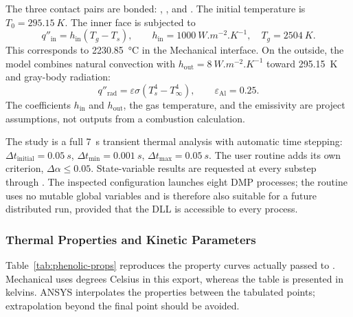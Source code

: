 \documentclass[oneside,openany]{amsdtx}
\begin{document}
The three contact pairs are bonded: ,
, and . The initial
temperature is \(T_0=\SI{295.15}{K}\). The inner face is subjected to
\begin{equation}
  q''_\mathrm{in}=h_\mathrm{in}(T_g-T_s),\qquad
  h_\mathrm{in}=\SI{1000}{W.m^{-2}.K^{-1}},\quad T_g=\SI{2504}{K}.
  \label{eq:inner-bc}
\end{equation}
This corresponds to \SI{2230.85}{\degreeCelsius} in the Mechanical interface.
On the outside, the model combines natural convection with
\(h_\mathrm{out}=\SI{8}{W.m^{-2}.K^{-1}}\) toward \SI{295.15}{K} and
gray-body radiation:
\begin{equation}
  q''_\mathrm{rad}=\varepsilon\sigma(T_s^4-T_\infty^4),\qquad
  \varepsilon_\mathrm{Al}=0{.}25.
\end{equation}
The coefficients \(h_\mathrm{in}\) and \(h_\mathrm{out}\), the gas
temperature, and the emissivity are project assumptions, not outputs from a
combustion calculation.

The study is a full \SI{7}{s} transient thermal analysis with automatic time
stepping: \(\Delta t_\mathrm{initial}=\SI{0.05}{s}\),
\(\Delta t_\mathrm{min}=\SI{0.001}{s}\),
\(\Delta t_\mathrm{max}=\SI{0.05}{s}\). The user routine adds its own
criterion, \(\Delta\alpha\le0{.}05\). State-variable results are requested at
every substep through . The inspected configuration
launches eight DMP processes; the routine uses no mutable global variables and
is therefore also suitable for a future distributed run, provided that the DLL
is accessible to every process.

\subsubsection{Thermal Properties and Kinetic Parameters}

Table~\ref{tab:phenolic-props} reproduces the property curves actually passed
to . Mechanical uses degrees Celsius in this export, whereas
the table is presented in kelvins. ANSYS interpolates the properties between
the tabulated points; extrapolation beyond the final point should be avoided.
\end{document}
